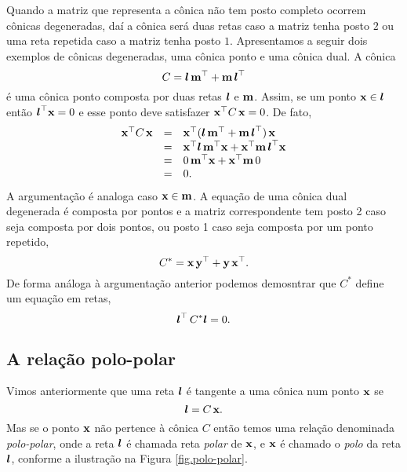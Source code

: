 Quando a matriz que representa a cônica não tem posto completo ocorrem cônicas degeneradas, daí a cônica será duas retas caso a matriz tenha posto $2$ ou uma reta repetida caso a matriz tenha posto $1$. Apresentamos a seguir dois exemplos de cônicas degeneradas, uma cônica ponto e uma cônica dual. A cônica 
\begin{equation*}
C=\boldsymbol{l}\,{\bf m}^\top+{\bf m}\,\boldsymbol{l}^\top
\end{equation*}
é uma cônica ponto composta por duas retas $\boldsymbol{l}$ e ${\bf m}$. Assim, se um ponto $\mathbf{x}\in\boldsymbol{l}$ então $\boldsymbol{l}^\top\mathbf{x}=0$ e esse ponto deve satisfazer $\mathbf{x}^\top C\,\mathbf{x}=0$. De fato,
\begin{equation*}
\begin{array}{rcl}
\mathbf{x}^\top C\,\mathbf{x}&=&\mathbf{x}^\top(\boldsymbol{l}\,{\bf m}^\top+{\bf m}\,\boldsymbol{l}^\top)\,\mathbf{x}\\
&=&\mathbf{x}^\top\boldsymbol{l}\,{\bf m}^\top\mathbf{x}+\mathbf{x}^\top {\bf m}\,\boldsymbol{l}^\top\mathbf{x}\\
&=&0\,{\bf m}^\top\mathbf{x}+\mathbf{x}^\top{\bf m}\,0\\
&=&0.
\end{array}
\end{equation*}
A argumentação é analoga caso $\mathbf{x}\in{\bf m}$. A equação de uma cônica dual degenerada é composta por pontos e a matriz correspondente tem posto 2 caso seja composta por dois pontos, ou posto 1 caso seja composta por um ponto repetido, 
\begin{equation*}
C^*=\mathbf{x}\,{\bf y}^\top+{\bf y}\,\mathbf{x}^\top.
\end{equation*}
De forma análoga à argumentação anterior podemos demosntrar que $C^*$ define um equação em retas,
\begin{equation*}
\boldsymbol{l}^\top\,C^*\boldsymbol{l}=0.
\end{equation*}
\subsection{A relação polo-polar}\label{sec.polo-polar}

Vimos anteriormente que uma reta $\boldsymbol{l}$ é tangente a uma cônica num ponto $\mathbf{x}$ se 
\begin{equation*}
\boldsymbol{l}=C\,\mathbf{x}.
\end{equation*}
Mas se o ponto $\mathbf{x}$ não pertence à cônica $C$ então temos uma relação denominada \textit{polo-polar}, onde a reta $\boldsymbol{l}$ é chamada reta \textit{polar} de $\mathbf{x}$, e $\mathbf{x}$ é chamado o \textit{polo} da reta $\boldsymbol{l}$, conforme a ilustração na Figura \ref{fig.polo-polar}.

